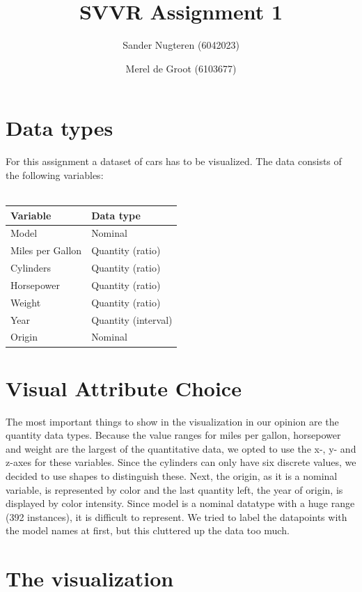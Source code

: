 \documentclass{article}
\begin{document}
\title{SVVR Assignment 1}
\author{Sander Nugteren (6042023) \and Merel de Groot (6103677)}
\renewcommand{\today}{November 3, 2014}
\maketitle

\section{Data types}
For this assignment a dataset of cars has to be visualized. The data consists
of the following variables:\\\\
\begin{tabular}{|l|l|}
	\hline
	Variable & Data type \\
	\hline
	Model & Nominal \\
	Miles per Gallon & Quantity (ratio) \\
	Cylinders & Quantity (ratio) \\
	Horsepower & Quantity (ratio) \\
	Weight & Quantity (ratio) \\
	Year & Quantity (interval) \\
	Origin & Nominal\\
	\hline
\end{tabular}

\section{Visual Attribute Choice}
The most important things to show in the visualization in our opinion are the
quantity data types. Because the value ranges for miles per gallon, horsepower and
weight are the largest of the quantitative data, we opted to use the x-, y- and z-axes for these variables. Since the cylinders can only have six discrete values, we decided to use shapes to distinguish these. 
Next, the origin, as it is a nominal variable, is represented by color and the last quantity left, the year of origin, is displayed by color intensity. Since model is a nominal datatype with a huge range (392 instances), it is difficult to represent. We tried to label the datapoints with the model names at first, but this cluttered up the data too much.

\section{The visualization}
\end{document}

